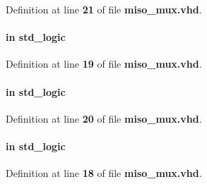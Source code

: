 Definition at line {\bf 21} of file {\bf miso\+\_\+mux.\+vhd}.

\paragraph[{ext\+\_\+miso}]{ {\bfseries \textcolor{keywordflow}{in}\textcolor{vhdlchar}{ }} {\bfseries \textcolor{comment}{std\+\_\+logic}\textcolor{vhdlchar}{ }} \hspace{0.3cm}{\ttfamily [Port]}}\label{classmiso__mux_a873e89a3525afdc7ce806ea308f064bb}


Definition at line {\bf 19} of file {\bf miso\+\_\+mux.\+vhd}.

\paragraph[{fpga\+\_\+cs}]{ {\bfseries \textcolor{keywordflow}{in}\textcolor{vhdlchar}{ }} {\bfseries \textcolor{comment}{std\+\_\+logic}\textcolor{vhdlchar}{ }} \hspace{0.3cm}{\ttfamily [Port]}}\label{classmiso__mux_ac919f88479a1e48dce159aa318b502bd}


Definition at line {\bf 20} of file {\bf miso\+\_\+mux.\+vhd}.

\paragraph[{fpga\+\_\+miso}]{ {\bfseries \textcolor{keywordflow}{in}\textcolor{vhdlchar}{ }} {\bfseries \textcolor{comment}{std\+\_\+logic}\textcolor{vhdlchar}{ }} \hspace{0.3cm}{\ttfamily [Port]}}\label{classmiso__mux_ae1a8303ea6c81e15ca09676753cea532}


Definition at line {\bf 18} of file {\bf miso\+\_\+mux.\+vhd}.

\paragraph[{ieee}]{\hspace{0.3cm}{\ttfamily [Library]}}\label{classmiso__mux_a0a6af6eef40212dbaf130d57ce711256}


